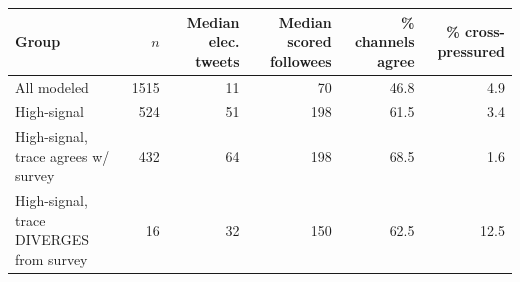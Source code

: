 \begin{tabular}{lrrrrr}
\toprule
Group & $n$ & Median elec. tweets & Median scored followees & \% channels agree & \% cross-pressured \\
\midrule
All modeled & 1515 & 11 & 70 & 46.8 & 4.9 \\
High-signal & 524 & 51 & 198 & 61.5 & 3.4 \\
High-signal, trace agrees w/ survey & 432 & 64 & 198 & 68.5 & 1.6 \\
High-signal, trace DIVERGES from survey & 16 & 32 & 150 & 62.5 & 12.5 \\
\bottomrule
\end{tabular}